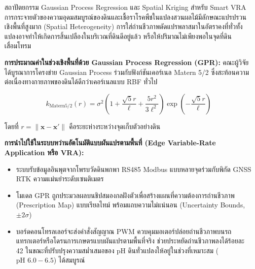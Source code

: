\begin{aibox}{สถาปัตยกรรม Gaussian Process Regression และ Spatial Kriging สำหรับ Smart VRA}
การกระจายตัวของความอุดมสมบูรณ์ของดินและเชื้อราโรคพืชในแปลงสวนผลไม้มีลักษณะแปรปรวนเชิงพื้นที่สูงมาก (Spatial Heterogeneity) การใส่ถ่านชีวภาพดัดแปรพลาสมาในอัตราคงที่ทั่วทั้งแปลงอาจทำให้เกิดการสิ้นเปลืองในบริเวณที่ดินดีอยู่แล้ว หรือให้ปริมาณไม่เพียงพอในจุดที่ดินเสื่อมโทรม

\textbf{การประมาณค่าในช่วงเชิงพื้นที่ด้วย Gaussian Process Regression (GPR):}
คณะผู้วิจัยได้บูรณาการโครงข่าย Gaussian Process ร่วมกับฟังก์ชันเคอร์เนล Matern 5/2 ซึ่งสะท้อนความต่อเนื่องทางกายภาพของดินได้ดีกว่าเคอร์เนลแบบ RBF ทั่วไป

\begin{equation}
    k_{\text{Matern5/2}}(r) = \sigma^2 \left( 1 + \frac{\sqrt{5}r}{\ell} + \frac{5r^2}{3\ell^2} \right) \exp \left( -\frac{\sqrt{5}r}{\ell} \right)
\end{equation}

โดยที่ $r = \|\mathbf{x} - \mathbf{x}'\|$ คือระยะห่างระหว่างจุดเก็บตัวอย่างดิน

\textbf{การนำไปใช้ในระบบหว่านอัตโนมัติแบบผันแปรตามพื้นที่ (Edge Variable-Rate Application หรือ VRA):}
\begin{itemize}
    \item ระบบรับข้อมูลอินพุตจากโพรบวัดดินพกพา RS485 Modbus แบบหลายจุดร่วมกับพิกัด GNSS RTK ความแม่นยำระดับเซนติเมตร
    \item โมเดล GPR ถูกประมวลผลบนชิปสมองกลฝังตัวเพื่อสร้างแผนที่ความต้องการถ่านชีวภาพ (Prescription Map) แบบเรียลไทม์ พร้อมแถบความไม่แน่นอน (Uncertainty Bounds, $\pm 2\sigma$)
    \item บอร์ดคอนโทรลเลอร์จะส่งคำสั่งสัญญาณ PWM ควบคุมมอเตอร์ปล่อยถ่านชีวภาพบนรถแทรกเตอร์หรือโดรนการเกษตรแบบผันแปรตามพื้นที่จริง ช่วยประหยัดถ่านชีวภาพลงได้ร้อยละ 42 ในขณะที่ปรับปรุงความสม่ำเสมอของ pH ดินทั่วแปลงให้อยู่ในช่วงที่เหมาะสม ($\text{pH } 6.0 - 6.5$) ได้สมบูรณ์
\end{itemize}
\end{aibox}

